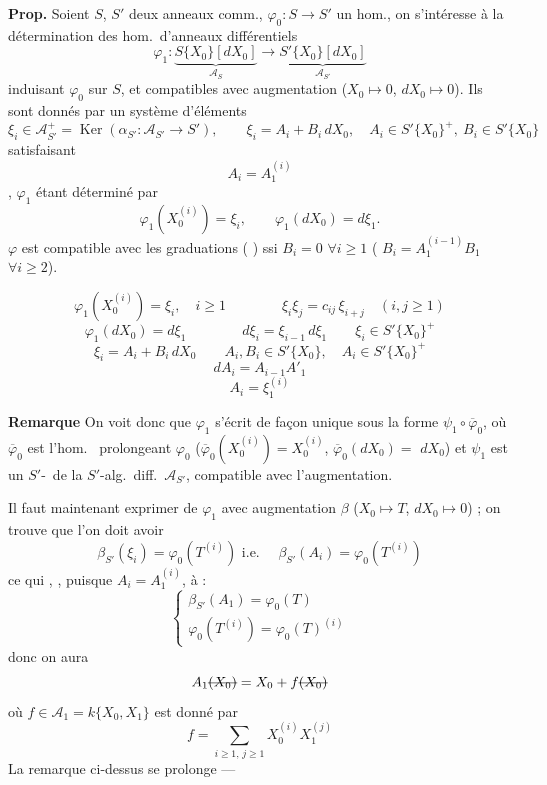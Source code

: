 \documentclass[11pt,a4paper]{article}
\begin{document}
\textbf{Prop.} Soient $S$, $S'$ deux anneaux comm., $\varphi_0 : S \to S'$ un hom., on s'intéresse à la détermination des hom.\ d'anneaux différentiels
\[
  \varphi_1 : \underbrace{S\{X_0\}[dX_0]}_{\mathcal{A}_S} \longrightarrow \underbrace{S'\{X_0\}[dX_0]}_{\mathcal{A}_{S'}}
\]
induisant $\varphi_0$ sur $S$, et compatibles avec augmentation ($X_0 \mapsto 0$, $dX_0 \mapsto 0$). Ils sont donnés par un système d'éléments
\[
  \xi_i \in \mathcal{A}_{S'}^{+} = \operatorname{Ker}(\alpha_{S'} : \mathcal{A}_{S'} \to S'),
  \qquad \xi_i = A_i + B_i\, dX_0, \quad A_i \in S'\{X_0\}^+,\ B_i \in S'\{X_0\}
\]
satisfaisant
\[
  A_i = A_1^{(i)}
\]
\ill{}, $\varphi_1$ étant déterminé par
\[
  \varphi_1(X_0^{(i)}) = \xi_i, \qquad \varphi_1(dX_0) = d\xi_1 .
\]
$\varphi$ est compatible avec les graduations ( ) ssi $B_i = 0$ $\forall i \geq 1$ ( $B_i = A_1^{(i-1)} B_1$ $\forall i \geq 2$).

\[
  \varphi_1(X_0^{(i)}) = \xi_i, \quad i \geq 1 \qquad\qquad
  \boxed{\xi_i \xi_j = c_{ij}\, \xi_{i+j}} \quad (i, j \geq 1)
\]
\[
  \varphi_1(dX_0) = d\xi_1 \qquad\qquad
  \boxed{d\xi_i = \xi_{i-1}\, d\xi_1} \qquad
  \boxed{\xi_i \in S'\{X_0\}^+}
\]
\[
  \xi_i = A_i + B_i\, dX_0 \qquad A_i, B_i \in S'\{X_0\}, \quad A_i \in S'\{X_0\}^+
\]
\[
  dA_i = A_{i-1} A'_1
\]
\[
  A_i = \xi_1^{(i)}
\]

\textbf{Remarque} On voit donc que  $\varphi_1$ s'écrit de façon unique sous la forme $\psi_1 \circ \overline{\varphi}_0$, où $\overline{\varphi}_0$ est l'hom.\  prolongeant $\varphi_0$ ($\overline{\varphi}_0(X_0^{(i)}) = X_0^{(i)}$, $\overline{\varphi}_0(dX_0) =$ \struck{\ill{}} $dX_0$) et $\psi_1$ est un $S'$-\ de la $S'$-alg.\ diff.\ $\mathcal{A}_{S'}$, compatible avec l'augmentation.

Il faut maintenant exprimer   de $\varphi_1$ avec augmentation $\beta$ ($X_0 \mapsto T$, $dX_0 \mapsto 0$) ; on trouve que l'on doit avoir
\[
  \beta_{S'}(\xi_i) = \varphi_0(T^{(i)}) \text{ i.e. } \quad
  \beta_{S'}(A_i) = \varphi_0(T^{(i)})
\]
ce qui \ill{}, , puisque $A_i = A_1^{(i)}$, à :
\[
  \begin{cases}
    \beta_{S'}(A_1) = \varphi_0(T) \\
    \varphi_0(T^{(i)}) = \varphi_0(T)^{(i)}
  \end{cases}
\]
donc on aura
\[
  A_1 \text{\struck{$(X_0)$}} = X_0 + f \text{\struck{$(X_0)$}}
\]
où $f \in \mathcal{A}_{1} = k\{X_0, X_1\}$ est donné par
\[
  f = \sum_{i \geq 1,\, j \geq 1} X_0^{(i)} X_1^{(j)}
\]
La remarque ci-dessus se prolonge ---
\end{document}
